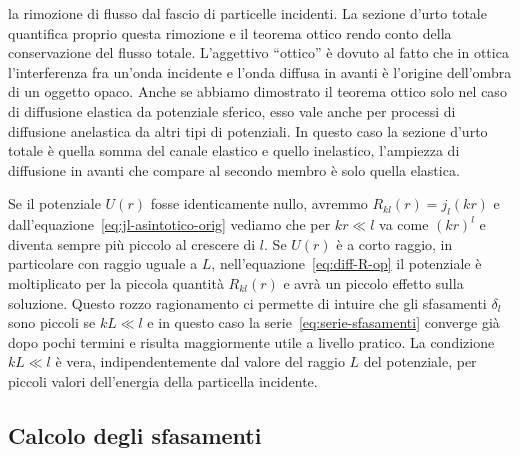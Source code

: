 \documentclass[a4paper,fleqn,twoside,12pt]{article}
\begin{document}
la rimozione di flusso dal fascio di particelle incidenti.  La sezione d'urto
totale quantifica proprio questa rimozione e il teorema ottico rendo conto della
conservazione del flusso totale.  L'aggettivo ``ottico'' è dovuto al fatto che
in ottica l'interferenza fra un'onda incidente e l'onda diffusa in avanti è
l'origine dell'ombra di un oggetto opaco.  Anche se abbiamo dimostrato il
teorema ottico solo nel caso di diffusione elastica da potenziale sferico, esso
vale anche per processi di diffusione anelastica da altri tipi di potenziali.
In questo caso la sezione d'urto totale è quella somma del canale elastico e
quello inelastico, l'ampiezza di diffusione in avanti che compare al secondo
membro è solo quella elastica.

Se il potenziale $U(r)$ fosse identicamente nullo, avremmo
$R_{kl}(r) = j_{l}(kr)$ e dall'equazione~\eqref{eq:jl-asintotico-orig} vediamo
che per $kr \ll l$ va come $(kr)^{l}$ e diventa sempre più piccolo al crescere
di $l$.  Se $U(r)$ è a corto raggio, in particolare con raggio uguale a $L$,
nell'equazione~\eqref{eq:diff-R-op} il potenziale è moltiplicato per la piccola
quantità $R_{kl}(r)$ e avrà un piccolo effetto sulla soluzione.  Questo rozzo
ragionamento ci permette di intuire che gli sfasamenti $\delta_{l}$ sono piccoli
se $kL \ll l$ e in questo caso la serie~\eqref{eq:serie-sfasamenti} converge già
dopo pochi termini e risulta maggiormente utile a livello pratico.  La
condizione $kL \ll l$ è vera, indipendentemente dal valore del raggio $L$ del
potenziale, per piccoli valori dell'energia della particella incidente.


\subsection{Calcolo degli sfasamenti}
\label{sec:calcolo-sfasamenti}
\end{document}
